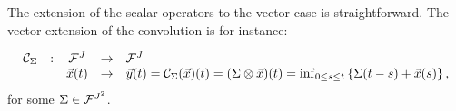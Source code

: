 %

The extension of the scalar operators to the vector case is straightforward.
The vector extension of the convolution is for instance:


\begin{definition}
$$ \begin{array}{ccccl}
\mathcal C_\Sigma & : & \mathcal F^J & \rightarrow & \mathcal F^J \\
        & & \vec{x}(t) & \rightarrow & \vec{y}(t) = \mathcal C_\Sigma (\vec{x})(t) = (\Sigma \otimes \vec{x})(t) = \inf_{0 \leq s \leq t} \left\{ \Sigma(t-s) + \vec{x}(s) \right\},
\end{array} $$
for some $\Sigma \in \mathcal F^{J^2}$.
\end{definition}

